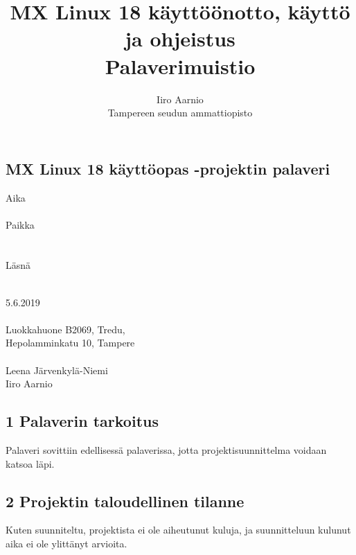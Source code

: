 \documentclass[a4paper, 12pt, finnish]{article}
\title{MX Linux 18 käyttöönotto, käyttö ja ohjeistus \\ \large Palaverimuistio} %
\author{Iiro Aarnio \\ Tampereen seudun ammattiopisto \\}
\begin{document}
\subsection*{MX Linux 18 käyttöopas -projektin palaveri}
\begin{minipage} [t] {0.4\textwidth}
	Aika\\\\
	Paikka\\\\\\
	Läsnä\\\\
\end{minipage}
\begin{minipage} [t] {0.6\textwidth}
	5.6.2019\\\\
	Luokkahuone B2069, Tredu,\\ Hepolamminkatu 10, Tampere\\\\
	Leena Järvenkylä-Niemi\\Iiro Aarnio\\
\end{minipage}

\subsection*{1 Palaverin tarkoitus}

\begin{minipage} [t] {0.4\textwidth}
    \phantom{a}
\end{minipage}
\begin{minipage} [t] {0.6\textwidth}
    Palaveri sovittiin edellisessä palaverissa, jotta projektisuunnittelma voidaan katsoa läpi.
\end{minipage}

\subsection*{2 Projektin taloudellinen tilanne}

\begin{minipage} [t] {0.4\textwidth}
    \phantom{a}
\end{minipage}
\begin{minipage} [t] {0.6\textwidth}
    Kuten suunniteltu, projektista ei ole aiheutunut kuluja, ja suunnitteluun kulunut aika ei ole ylittänyt arvioita.
\end{minipage}
\end{document}
